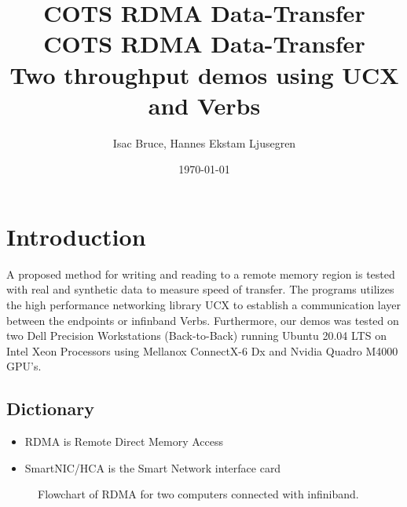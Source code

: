 \documentclass[a4paper,onecolumn]{article}
\begin{document}
\title{COTS RDMA Data-Transfer}
\title{%
  COTS RDMA Data-Transfer \\
  \large Two throughput demos using UCX and Verbs}



\author{Isac Bruce, Hannes Ekstam Ljusegren}

\date{\today}


\maketitle



\section{Introduction}
A proposed method for writing and reading to a remote memory region is tested with real and synthetic data to measure speed of transfer. The programs utilizes the high performance networking library UCX to establish a communication layer between the endpoints or infinband Verbs. Furthermore, our demos was tested on two Dell Precision Workstations (Back-to-Back) running Ubuntu 20.04 LTS on Intel Xeon Processors using Mellanox ConnectX-6 Dx and Nvidia Quadro M4000 GPU's.

\subsection{Dictionary}
\begin{itemize}
   \item RDMA is Remote Direct Memory Access
   \item SmartNIC/HCA is the Smart Network interface card
 \end{itemize}

\begin{figure}[H]
\begin{center}
\caption{Flowchart of RDMA for two computers connected with infiniband.}
\label{cpu-cpu-demo}
\end{center}
\end{figure}
\end{document}
